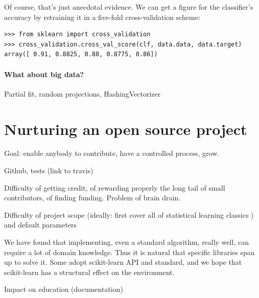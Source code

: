 \documentclass[a4paper]{article}
\begin{document}
Of course, that's just anecdotal evidence. We can get a figure for the
classifier's accuracy by retraining it in a five-fold cross-validation scheme:

\begin{lstlisting}
>>> from sklearn import cross_validation
>>> cross_validation.cross_val_score(clf, data.data, data.target)
array([ 0.91, 0.8825, 0.88, 0.8775, 0.86])
\end{lstlisting}

\paragraph{What about big data?}
%
Partial fit, random projections, HashingVectorizer

\section{Nurturing an open source project}

Goal: enable anybody to contribute, have a controlled process, grow.

Github, tests (link to travis)

Difficulty of getting credit, of rewarding properly the long tail of small
contributors, of finding funding. Problem of brain drain.

Difficulty of project scope (ideally: first cover all of statistical
learning classics \cite{elemstatlearn}) and default parameters

We have found that implementing, even a standard algorithm, really well,
can require a lot of domain knowledge. Thus it is natural that specific
libraries span up to solve it. Some adopt scikit-learn API and standard,
and we hope that scikit-learn has a structural effect on the environment.

Impact on education (documentation)

\small


\end{document}
